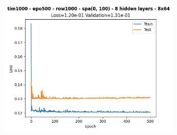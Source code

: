 \begin{figure}[H]
    \centering
    \begin{subfigure}{.47\linewidth}
        \centering
        \includegraphics[width=\textwidth]{other-models/2024-05-20T22:56:39.226673_pendulum_tim1000_epo500_row1000_spa(0, 100).jpg}
    \end{subfigure}
\end{figure}
